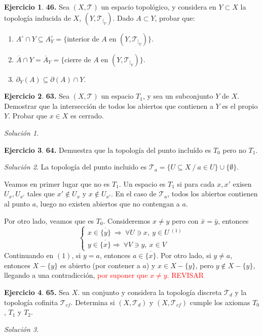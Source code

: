 \documentclass[12pt,twoside]{report}
\newcommand\mc[1]{\mathcal{#1}}
\theoremstyle{azul}
\theoremstyle{azul2}
\theoremstyle{plain}
\theoremstyle{definition}
\newtheorem*{ejer}{Ejercicio}
\theoremstyle{remark}
\newtheorem*{sol}{Solución}
\begin{document}
\begin{ejer}
    \textbf{46. } Sea $(X,\mc{T})$ un espacio topológico, y considera en $Y \subset X$ la topología inducida de $X$, $(Y, \mc{T}_{|_Y})$. Dado $A \subset Y$, probar que:
    \begin{enumerate}
        \item $A^{\circ} \cap Y \subseteq A^{\circ}_Y=\{$interior de $A$ en $(Y, \mc{T}_{|_Y})\}$.
        \item $\overline{A} \cap Y=\overline{A}_Y=\{$cierre de $A$ en $(Y, \mc{T}_{|_Y})\}$.
        \item $\partial_Y(A) \subseteq \partial(A)\cap Y$.
    \end{enumerate}
\end{ejer}
\begin{ejer}
    \textbf{63. } Sea $(X,\mc{T})$ un espacio $T_1$, y sea un subconjunto $Y$ de $X$. Demostrar que la intersección de todos los abiertos que contienen a $Y$ es el propio $Y$. Probar que $x \in X$ es cerrado.
\end{ejer}
\begin{sol}
    
\end{sol}
\begin{ejer}
    \textbf{64.} Demuestra que la topología del punto incluído es $T_0$ pero no $T_1$.
\end{ejer}
\begin{sol}
    La topología del punto incluido es $\mc{T}_a=\{U \subseteq X \: / \: a \in U\}\cup \{\emptyset\}$. 
    
    Veamos en primer lugar que no es $T_1$. Un espacio es $T_1$ si para cada $x,x'$ exisen $U_x, U_{x'}$ tales que $x' \nin U_x$ y $x \nin U_{x'}$. En el caso de $\mc{T}_a$, todos los abiertos contienen al punto $a$, luego no existen abiertos que no contengan a $a$.

    Por otro lado, veamos que es $T_0$. Consideremos $x \neq y$ pero con $\bar{x}=\bar{y}$, entonces 
    $$\left\{\begin{array}{l}
         x \in \overline{\{y\}} \:  \Rightarrow \: \forall U \ni x, \: y \in U \: ^{(1)} \\
         y \in \overline{\{x\}} \Rightarrow \: \forall V \ni y, \: x \in V 
    \end{array}  \right.$$
    Continuando en $(1)$, 
    si $y=a$, entonces $a \in \overline{\{x\}}$. Por otro lado, si $y \neq a$, entonces $X-\{y\}$ es abierto (por contener a $a$) y $x \in X-\{y\}$, pero $y \nin X-\{y\}$, llegando a una contradicción, \textcolor{red}{por suponer que $x\neq y$. REVISAR}
    \end{sol}
\begin{ejer}
    \textbf{65.} Sea $X$. un conjunto y considera la topología discreta $\mc{T}_d$ y la topología cofinita $\mc{T}_{cf}$. Determina si $(X, \mc{T}_d)$ y $(X, \mc{T}_{cf})$ cumple los axiomas $T_0$, $T_1$ y $T_2$.
\end{ejer}
\begin{sol}
    
\end{sol}
\end{document}
